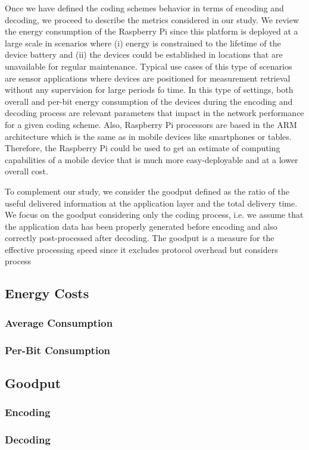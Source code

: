 \label{sec:metrics}

Once we have defined the coding schemes behavior in terms of encoding
and decoding, we proceed to describe the metrics considered in our study.
We review the energy consumption of the Raspberry Pi since this platform
is deployed at a large scale in scenarios where (i) energy is
constrained to the lifetime of the device battery and (ii) the devices
could be established in locations that are unavailable for regular
maintenance. Typical use cases of this type of scenarios are sensor
applications where devices are positioned for measurement retrieval
without any supervision for large periods fo time. In this type of
settings, both overall and per-bit energy consumption of the devices
during the encoding and decoding process are relevant parameters that
impact in the network performance for a given coding scheme. Also,
Raspberry Pi processors are based in the \ac{ARM} architecture which
is the same as in mobile devices like smartphones or tables.
Therefore, the Raspberry Pi could be used to get an estimate of
computing capabilities of a mobile device that is much more easy-deployable
and at a lower overall cost.

To complement our study, we consider the goodput defined as the ratio
of the useful delivered information at the application layer and the total
delivery time. We focus on the goodput considering only the coding process,
i.e. we assume that the application data has been properly
generated before encoding and also correctly post-processed after decoding.
The goodput is a measure for the effective processing speed since it
excludes protocol overhead but considers process

\subsection{Energy Costs}
\subsubsection{Average Consumption}
\subsubsection{Per-Bit Consumption}

\subsection{Goodput}
\subsubsection{Encoding}
\subsubsection{Decoding}

